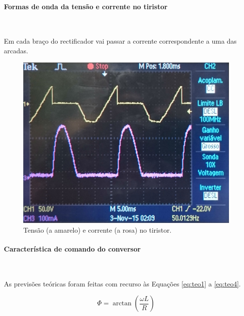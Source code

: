\documentclass[a4paper,11pt]{article}
\numberwithin{equation}{section}
\begin{document}
\paragraph{Formas de onda da tensão e corrente no tiristor} \mbox{}\

Em cada braço do rectificador vai passar a corrente correspondente a uma das arcadas.

\begin{figure}[H]
	\centering
	\includegraphics[keepaspectratio=true, scale=0.15]{img/DSC_0185}
	\caption{Tensão (a amarelo) e corrente (a rosa) no tiristor.}
	\label{fig:tctiristorlacuna}
	\vspace{-0.8em}
\end{figure}


\paragraph{Característica de comando do conversor} \mbox{}\

As previsões teóricas foram feitas com recurso às Equações \ref{eq:teo1} a \ref{eq:teo4}.

\begin{equation}
\label{eq:teo1}
\Phi = \arctan{(\frac{\omega L}{R})}
\end{equation}
\end{document}

